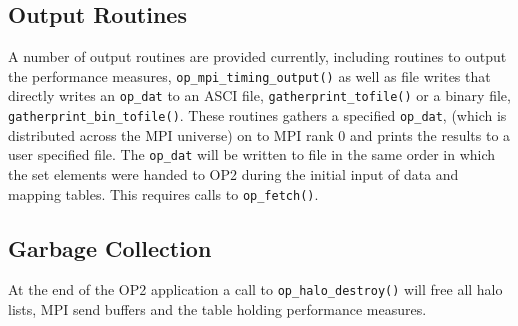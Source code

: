 \documentclass[12pt]{article}
\begin{document}
\subsection{Output Routines}\label{subsec/output}
A number of output routines are provided currently, including routines to output the performance measures,
\texttt{op\_mpi\_timing\_output()} as well as file writes that directly writes an \texttt{op\_dat} to an ASCI file,
\texttt{gatherprint\_tofile()} or a binary file, \texttt{gatherprint\_bin\_tofile()}. These routines gathers a specified
\texttt{op\_dat}, (which is distributed across the MPI universe) on to MPI rank 0 and prints the results to a user
specified file. The \texttt{op\_dat} will be written to file in the same order in which the set elements were handed to
OP2 during the initial input of data and mapping tables. This requires calls to \texttt{op\_fetch()}.

\subsection{Garbage Collection}\label{subsec/cleanup}
At the end of the OP2 application a call to \texttt{op\_halo\_destroy()} will free all halo lists, MPI send buffers and
the table holding performance measures. 

\newpage
\end{document}
